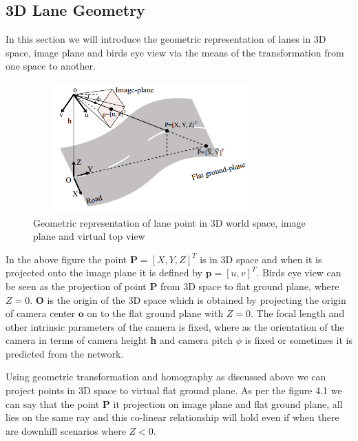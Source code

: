         \subsection{3D Lane Geometry}
        In this section we will introduce the geometric representation of lanes in 3D space, image plane and birds eye view via the means of the transformation from one space to another. 
        
         \begin{figure}[h]
    \centering
    \includegraphics[width=9cm, height=5cm]{images/3d_lane_geometry.png}
    \caption{Geometric representation of lane point in 3D world space, image plane and virtual top view \cite{DBLP:journals/corr/abs-2112-15351}}
    \end{figure}
    
    In the above figure the point $\textbf{P} =[X, Y, Z]^{T}$ is in 3D space and when it is projected onto the image plane it is defined by $\textbf{p} = [u, v]^{T}$. Birds eye view can be seen as the projection of point $\textbf{P}$ from 3D space to flat ground plane, where $Z=0$. $\textbf{O}$ is the origin of the 3D space which is obtained by projecting the origin of camera center $\textbf{o}$ on to the flat ground plane with $Z = 0$. The focal length and other intrinsic parameters of the camera is fixed, where as the orientation of the camera in terms of camera height \textbf{h}  and camera pitch \textbf{$\phi$} is fixed or sometimes it is predicted from the network. 
    
    Using geometric transformation and homography as discussed above we can project points in 3D space to virtual flat ground plane. As per the figure 4.1 we can say that the point \textbf{P} it projection on image plane and flat ground plane, all lies on the same ray and this co-linear relationship will hold even if when there are downhill scenarios where $Z<0$. 
    
